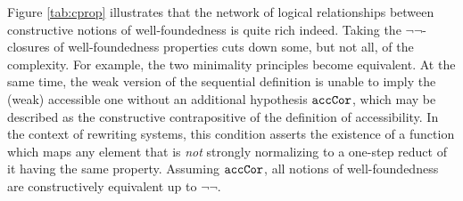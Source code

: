 Figure \ref{tab:cprop} illustrates that the network of logical relationships between
constructive notions of well-foundedness is quite rich indeed. 
Taking the $\lnot\lnot$-closures of 
well-foundedness properties cuts down some, but not all, of the complexity.
For example, the two minimality principles become equivalent.
At the same time, the weak version of the sequential definition is unable to imply 
the (weak) accessible one without an additional hypothesis $\mathtt{accCor}$, 
which may be described as the constructive contrapositive of the definition of accessibility.
In the context of rewriting systems,
this condition asserts the existence of a function which maps any
element that is \emph{not} strongly normalizing to a one-step reduct of it having the same property.
Assuming $\mathtt{accCor}$, all notions of well-foundedness
are constructively equivalent up to $\lnot\lnot$.

